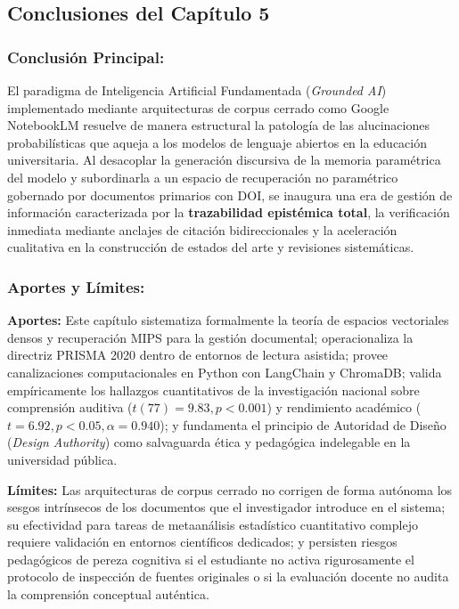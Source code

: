 \subsection*{Conclusiones del Capítulo 5}

\subsubsection*{Conclusión Principal:}
El paradigma de Inteligencia Artificial Fundamentada (\textit{Grounded AI}) implementado mediante arquitecturas de corpus cerrado como Google NotebookLM resuelve de manera estructural la patología de las alucinaciones probabilísticas que aqueja a los modelos de lenguaje abiertos en la educación universitaria. Al desacoplar la generación discursiva de la memoria paramétrica del modelo y subordinarla a un espacio de recuperación no paramétrico gobernado por documentos primarios con DOI, se inaugura una era de gestión de información caracterizada por la \textbf{trazabilidad epistémica total}, la verificación inmediata mediante anclajes de citación bidireccionales y la aceleración cualitativa en la construcción de estados del arte y revisiones sistemáticas.

\subsubsection*{Aportes y Límites:}
\textbf{Aportes:} Este capítulo sistematiza formalmente la teoría de espacios vectoriales densos y recuperación MIPS para la gestión documental; operacionaliza la directriz PRISMA 2020 dentro de entornos de lectura asistida; provee canalizaciones computacionales en Python con LangChain y ChromaDB; valida empíricamente los hallazgos cuantitativos de la investigación nacional sobre comprensión auditiva ($t(77)=9.83, p<0.001$) y rendimiento académico ($t=6.92, p<0.05, \alpha=0.940$); y fundamenta el principio de Autoridad de Diseño (\textit{Design Authority}) como salvaguarda ética y pedagógica indelegable en la universidad pública.

\textbf{Límites:} Las arquitecturas de corpus cerrado no corrigen de forma autónoma los sesgos intrínsecos de los documentos que el investigador introduce en el sistema; su efectividad para tareas de metaanálisis estadístico cuantitativo complejo requiere validación en entornos científicos dedicados; y persisten riesgos pedagógicos de pereza cognitiva si el estudiante no activa rigurosamente el protocolo de inspección de fuentes originales o si la evaluación docente no audita la comprensión conceptual auténtica.


